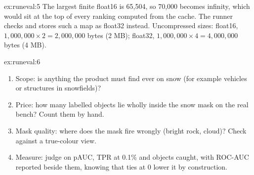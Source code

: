 \begin{solution}{ex:runeval:5}
The largest finite float16 is 65,504, so 70,000 becomes infinity, which would sit at the top of every ranking computed
from the cache. The runner checks  and stores such a map as float32 instead.
Uncompressed sizes: float16, $1{,}000{,}000 \times 2 = 2{,}000{,}000$ bytes (2 MB); float32,
$1{,}000{,}000 \times 4 = 4{,}000{,}000$ bytes (4 MB).
\end{solution}

\begin{solution}{ex:runeval:6}
\begin{enumerate}
\item Scope: is anything the product must find ever on snow (for example vehicles or structures in snowfields)?
\item Price: how many labelled objects lie wholly inside the snow mask on the real bench? Count them by hand.
\item Mask quality: where does the mask fire wrongly (bright rock, cloud)? Check against a true-colour view.
\item Measure: judge on pAUC, TPR at 0.1\% and objects caught, with ROC-AUC reported beside them, knowing that ties at
0 lower it by construction.
\end{enumerate}
\end{solution}
